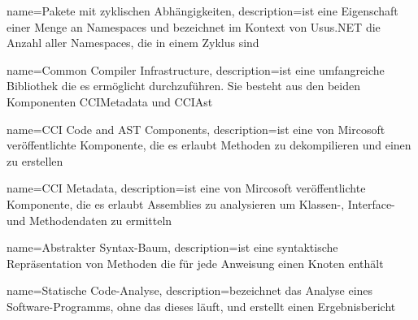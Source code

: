 {
   name={Pakete mit zyklischen Abh\"angigkeiten},
   description={ist eine Eigenschaft einer Menge an Namespaces und bezeichnet im Kontext von Usus.NET die Anzahl aller Namespaces, die in einem Zyklus sind}
}

{
   name={Common Compiler Infrastructure},
   description={ist eine umfangreiche Bibliothek die es erm\"oglicht  durchzuf\"uhren. Sie besteht aus den beiden Komponenten \gls{CCIMetadata} und \gls{CCIAst}}
}

{
   name={CCI Code and AST Components},
   description={ist eine von Mircosoft ver\"offentlichte Komponente, die es erlaubt Methoden zu dekompilieren und einen  zu erstellen}
}

{
   name={CCI Metadata},
   description={ist eine von Mircosoft ver\"offentlichte Komponente, die es erlaubt Assemblies zu analysieren um Klassen-, Interface- und Methodendaten zu ermitteln}
}

{
   name={Abstrakter Syntax-Baum},
   description={ist eine syntaktische Repr\"asentation von Methoden die f\"ur jede Anweisung einen Knoten enth\"alt}
}

{
   name={Statische Code-Analyse},
   description={bezeichnet das Analyse eines Software-Programms, ohne das dieses l\"auft, und erstellt einen Ergebnisbericht}
}
